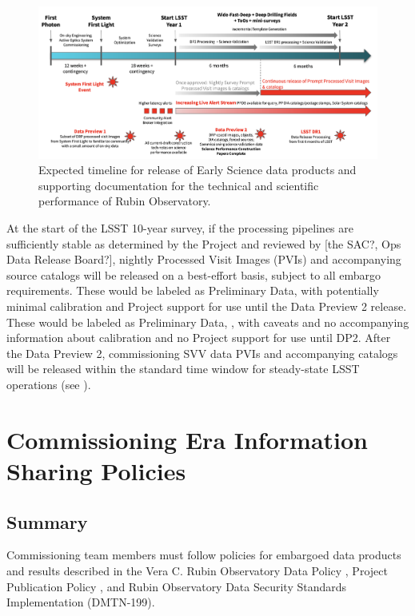 \documentclass[SE,authoryear,toc,lsstdraft]{lsstdoc}
\begin{document}
\begin{figure}
  \includegraphics[width=1.0\textwidth]{timeline.png}
  \caption{Expected timeline for release of Early Science data products and supporting documentation for the technical and scientific performance of Rubin Observatory.}
  \label{timeline}
\end{figure}

At the start of the LSST 10-year survey, if the processing pipelines are sufficiently stable as determined by the Project and reviewed by [the SAC?, Ops Data Release Board?], nightly Processed Visit Images (PVIs) and accompanying source catalogs will be released on a best-effort basis, subject to all embargo requirements. These would be labeled as Preliminary Data, with potentially minimal calibration and Project support for use until the Data Preview 2 release. These would be labeled as Preliminary Data, , with caveats and no accompanying information about calibration and no Project support for use until DP2.  After the Data Preview 2, commissioning SVV data PVIs and accompanying catalogs will be released within the standard time window for steady-state LSST operations (see ).

\section{Commissioning Era Information Sharing Policies}
\label{policy}

\subsection{Summary}

Commissioning team members must follow policies for embargoed data products and results described in the Vera C. Rubin Observatory Data Policy , Project Publication Policy , and Rubin Observatory Data Security Standards Implementation (DMTN-199).
\end{document}
